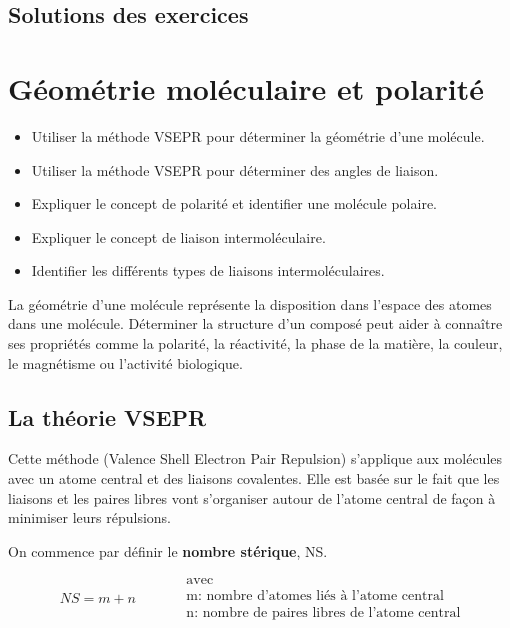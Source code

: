 \documentclass[
  11pt,
  a4paper,
  openany]{book}
\providecommand{\tightlist}{%
  \setlength{\itemsep}{0pt}\setlength{\parskip}{0pt}}
\begin{document}
\section{Solutions des exercices} \shipoutAnswer

\chapter{Géométrie moléculaire et polarité}\label{guxe9omuxe9trie-moluxe9culaire-et-polarituxe9}

\begin{objectives}

\begin{itemize}
\tightlist
\item
  Utiliser la méthode VSEPR pour déterminer la géométrie d'une molécule.
\item
  Utiliser la méthode VSEPR pour déterminer des angles de liaison.
\item
  Expliquer le concept de polarité et identifier une molécule polaire.
\item
  Expliquer le concept de liaison intermoléculaire.
\item
  Identifier les différents types de liaisons intermoléculaires.
\end{itemize}

\end{objectives}

La géométrie d'une molécule représente la disposition dans l'espace des atomes dans une molécule. Déterminer la structure d'un composé peut aider à connaître ses propriétés comme la polarité, la réactivité, la phase de la matière, la couleur, le magnétisme ou l'activité biologique.

\section{La théorie VSEPR}\label{la-thuxe9orie-vsepr}

Cette méthode (Valence Shell Electron Pair Repulsion) s'applique aux molécules avec un atome central et des liaisons covalentes. Elle est basée sur le fait que les liaisons et les paires libres vont s'organiser autour de l'atome central de façon à minimiser leurs répulsions.

On commence par définir le \textbf{nombre stérique}, NS.

\[ \begin{split}
    NS = m + n
  \end{split}
  \qquad
  \begin{split}
    &\text{avec} \\
    &\text{m: nombre d'atomes liés à l'atome central} \\
    &\text{n: nombre de paires libres de l'atome central}
  \end{split} \]
\end{document}
